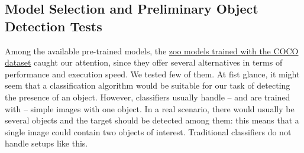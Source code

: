\documentclass[10pt,conference,compsocconf]{IEEEtran}
\begin{document}
\subsection{Model Selection and Preliminary Object Detection Tests}
Among the available pre-trained models, the \href{https://github.com/tensorflow/models/blob/master/research/object\_detection/g3doc/detection_model_zoo.md}{zoo models trained with the COCO dataset} caught our attention, since they offer several alternatives in terms of performance and execution speed. We tested few of them.
At fist glance, it might seem that a classification algorithm would be suitable for our task of detecting the presence of an object.
However, classifiers usually handle -- and are trained with -- simple images with one object. In a real scenario, there would usually be several objects and the target should be detected among them: this means that a single image could contain two objects of interest. Traditional classifiers do not handle setups like this.
\end{document}
